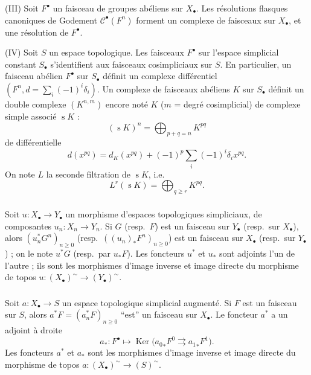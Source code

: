 \documentclass[11pt]{amsart}
\theoremstyle{plain}
\theoremstyle{definition}
\DeclareMathOperator{\Ker}{Ker}
\DeclareMathOperator{\simp}{s}
\begin{document}
(III) Soit $F^\bullet$ un faisceau de groupes ab\'eliens sur $X_\bullet$. Les r\'esolutions flasques
canoniques de Godement $\mathscr{C}^\bullet(F^n)$ forment un complexe de faisceaux sur $X_\bullet$, et une
r\'esolution de $F^\bullet$.

(IV) Soit $S$ un espace topologique. Les faisceaux $F^\bullet$ sur l'espace simplicial constant $S_\bullet$
s'identifient aux faisceaux cosimpliciaux sur $S$. En particulier, un faisceau ab\'elien $F^\bullet$
sur $S_\bullet$ d\'efinit un complexe diff\'erentiel $(F^n, d = \sum_i (-1)^i \delta_i)$. Un complexe de faisceaux
ab\'eliens $K$ sur $S_\bullet$ d\'efinit un double complexe $(K^{n,m})$ encore not\'e $K$ ($m$ = degr\'e cosimplicial)
de complexe simple associ\'e $\simp K$ :
\begin{equation}\label{eq:5.1.9.1}
(\simp K)^n = \bigoplus_{p+q=n} K^{pq}
\end{equation}
de diff\'erentielle
\begin{equation}\label{eq:5.1.9.2}
d(x^{pq}) = d_K(x^{pq}) + (-1)^p \sum_i (-1)^i \delta_i x^{pq}.
\end{equation}
On note $L$ la seconde filtration de $\simp K$, i.e.
\begin{equation}\label{eq:5.1.9.3}
L^r(\simp K) = \bigoplus_{q \geq r} K^{pq}.
\end{equation}

\subsubsection{}
Soit $u : X_\bullet \to Y_\bullet$ un morphisme d'espaces topologiques simpliciaux, de composantes $u_n : X_n \to Y_n$.
Si $G$ (resp.\ $F$) est un faisceau sur $Y_\bullet$ (resp.\ sur $X_\bullet$), alors $(u_n^* G^n)_{n \geq 0}$ (resp.\ $(({u_n})_* F^n)_{n \geq 0}$) est un faisceau sur $X_\bullet$ (resp.\ sur $Y_\bullet$) ;
on le note $u^* G$ (resp.\ par $u_* F$).
Les foncteurs $u^*$ et $u_*$ sont adjoints l'un de l'autre ;
ils sont les morphismes d'image inverse et image directe du morphisme de topos $u : (X_\bullet)^\sim \to (Y_\bullet)^\sim$.

\subsubsection{}
Soit $a : X_\bullet \to S$ un espace topologique simplicial augment\'e. Si $F$ est un faisceau sur $S$, alors $a^* F = (a_n^* F)_{n \geq 0}$ ``est'' un faisceau sur $X_\bullet$. Le foncteur $a^*$ a un adjoint \`a droite
\begin{equation}\label{eq:5.1.11.1}
a_* : F^\bullet \mapsto \Ker\big({a_0}_* F^0 \rightrightarrows {a_1}_* F^1\big).
\end{equation}
Les foncteurs $a^*$ et $a_*$ sont les morphismes d'image inverse et image directe du morphisme de topos $a : (X_\bullet)^\sim \to (S)^\sim$.
\end{document}
